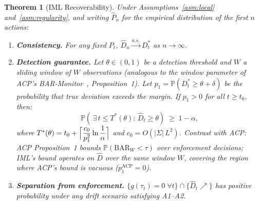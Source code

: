 \documentclass[11pt]{article}
\newtheorem{theorem}{Theorem}[section]
\newcommand{\Dhat}{\widehat{D}}
\newcommand{\Prob}{\mathbb{P}}
\begin{document}
\begin{theorem}[IML Recoverability]
\label{thm:iml}
Under Assumptions~\ref{asm:local} and~\ref{asm:regularity}, and writing
$\hat{P}_n$ for the empirical distribution of the first $n$ actions:
\begin{enumerate}[label=\textup{(\arabic*)}, nosep, leftmargin=2em]
  \item \textbf{Consistency.}
        For any fixed $P_t$,
        $\Dhat_n \xrightarrow{a.s.} D_t^*$ as $n \to \infty$.

  \item \textbf{Detection guarantee.}
        Let $\theta \in (0,1)$ be a detection threshold and $W$ a
        sliding window of $W$ observations (analogous to the window
        parameter of ACP's BAR-Monitor~\citep{fernandez2026acp},
        Proposition~1).  Let $p_1 = \Prob(D_t^* \geq \theta + \delta)$
        be the probability that true deviation exceeds the margin.
        If $p_1 > 0$ for all $t \geq t_0$, then:
        \[
          \Prob\!\left(\,\exists\, t \leq T^*(\theta) :\, \Dhat_t \geq \theta\right)
          \;\geq\; 1 - \alpha,
        \]
        where $T^*(\theta) = t_0 + \Bigl\lceil
            \dfrac{c_0}{p_1^2}\ln\dfrac{1}{\alpha}
          \Bigr\rceil$
        and $c_0 = O(|\Sigma|\,L^2)$.
        \emph{Contrast with ACP:} ACP Proposition~1 bounds
        $\Prob(\mathrm{BAR}_W < \tau)$ over enforcement decisions;
        IML's bound operates on $\Dhat$ over the same window $W$,
        covering the region where ACP's bound is vacuous ($p_1^{\mathrm{ACP}}=0$).

  \item \textbf{Separation from enforcement.}
        $\{g(\tau_t)=0\;\forall t\} \cap \{\Dhat_t \nearrow\}$ has positive
        probability under any drift scenario satisfying A1--A2.
\end{enumerate}
\end{theorem}
\end{document}
